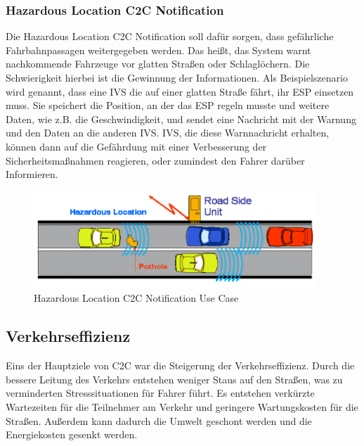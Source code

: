 \subsubsection{Hazardous Location C2C Notification}

Die Hazardous Location C2C Notification soll dafür sorgen, dass gefährliche Fahrbahnpassagen weitergegeben werden. Das heißt, das System warnt nachkommende Fahrzeuge vor glatten Straßen oder Schlaglöchern. Die Schwierigkeit hierbei ist die Gewinnung der Informationen. Als Beispielszenario wird genannt, dass eine \ac{IVS} die auf einer glatten Straße fährt, ihr ESP einsetzen muss. Sie speichert die Position, an der das ESP regeln musste und weitere Daten, wie z.B. die Geschwindigkeit, und sendet eine Nachricht mit der Warnung und den Daten an die anderen \ac{IVS}. \ac{IVS}, die diese Warnnachricht erhalten, können dann auf die Gefährdung mit einer Verbesserung der Sicherheitsmaßnahmen reagieren, oder zumindest den Fahrer darüber Informieren. 

\begin{figure}[htbp]
\includegraphics[width=0.95\textwidth]{content/images/06_use_cases/hln.png}
\caption{Hazardous Location C2C Notification Use Case \cite{etsi102638}}
\label{fig:hln}
\end{figure}

\subsection{Verkehrseffizienz}
Eins der Hauptziele von \acl{C2C} war die Steigerung der Verkehrseffizienz. Durch die bessere Leitung des Verkehrs entstehen weniger Staus auf den Straßen, was zu verminderten Stresssituationen für Fahrer führt. Es entstehen verkürzte Wartezeiten für die Teilnehmer am Verkehr und geringere Wartungskosten für die Straßen. Außerdem kann dadurch die Umwelt geschont werden und die Energiekosten gesenkt werden. 

